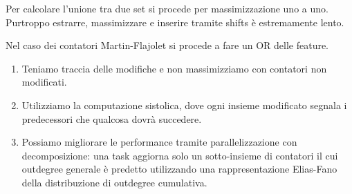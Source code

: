 \documentclass[\main/main.tex]{subfiles}
\begin{document}
\begin{multicols}{2}
\begin{observation}
    Per calcolare l'unione tra due set si procede per massimizzazione uno a uno. Purtroppo estrarre, massimizzare e inserire tramite shifts è estremamente lento.
    
    Nel caso dei contatori Martin-Flajolet si procede a fare un OR delle feature.
\end{observation}
\begin{observation}
    \begin{enumerate}
        \item Teniamo traccia delle modifiche e non massimizziamo con contatori non modificati.
        \item Utilizziamo la computazione sistolica, dove ogni insieme modificato segnala i predecessori che qualcosa dovrà succedere.
        \item Possiamo migliorare le performance tramite parallelizzazione con decomposizione: una task aggiorna solo un sotto-insieme di contatori il cui outdegree generale è predetto utilizzando una rappresentazione Elias-Fano della distribuzione di outdegree cumulativa.
    \end{enumerate}
\end{observation}
\end{multicols}
\end{document}
